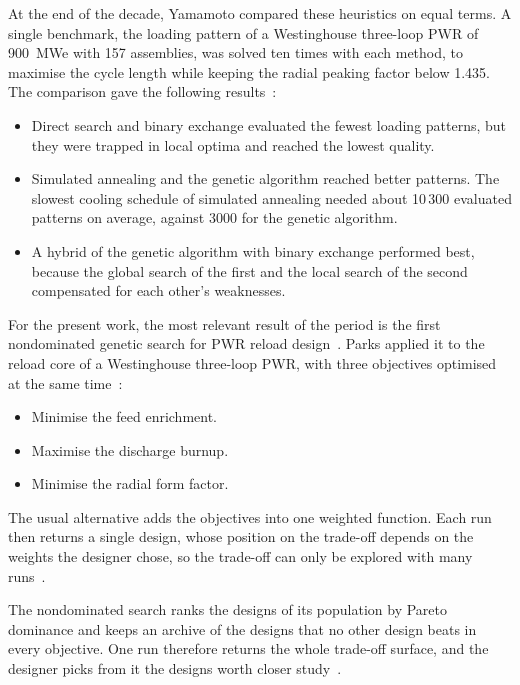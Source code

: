 At the end of the decade, Yamamoto compared these heuristics on equal
terms. A single benchmark, the loading pattern of a Westinghouse
three-loop PWR of 900~MWe with 157 assemblies, was solved ten times with
each method, to maximise the cycle length while keeping
the radial peaking factor below 1.435. The comparison gave the following
results~\cite{yamamoto_1997}:

\begin{itemize}
  \item Direct search and binary exchange evaluated the fewest loading
        patterns, but they were trapped in local optima and reached the
        lowest quality.

  \item Simulated annealing and the genetic algorithm reached better
        patterns. The slowest cooling schedule of simulated annealing
        needed about 10\,300 evaluated patterns on average, against 3000
        for the genetic algorithm.

  \item A hybrid of the genetic algorithm with binary exchange performed
        best, because the global search of the first and the local search
        of the second compensated for each other's weaknesses.
\end{itemize}

For the present work, the most relevant result of the period is the
first nondominated genetic search for PWR reload
design~\cite{parks_1996}. Parks applied it to the reload core of a
Westinghouse three-loop PWR, with three objectives optimised at the same
time~\cite{parks_1996}:

\begin{itemize}
  \item Minimise the feed enrichment.

  \item Maximise the discharge burnup.

  \item Minimise the radial form factor.
\end{itemize}

The usual alternative adds the objectives into one weighted function.
Each run then returns a single design, whose position on the trade-off
depends on the weights the designer chose, so the trade-off can only be
explored with many runs~\cite{parks_1996}.

The nondominated search ranks the designs of its population by Pareto
dominance and keeps an archive of the designs that no other design beats
in every objective. One run therefore returns the whole trade-off
surface, and the designer picks from it the designs worth closer
study~\cite{parks_1996}.

